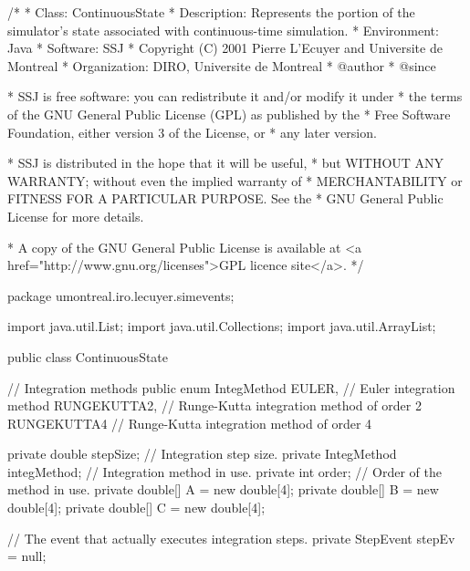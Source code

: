 \begin{code}
\begin{hide}
/*
 * Class:        ContinuousState
 * Description:  Represents the portion of the simulator's state associated
                 with continuous-time simulation.
 * Environment:  Java
 * Software:     SSJ 
 * Copyright (C) 2001  Pierre L'Ecuyer and Universite de Montreal
 * Organization: DIRO, Universite de Montreal
 * @author       
 * @since

 * SSJ is free software: you can redistribute it and/or modify it under
 * the terms of the GNU General Public License (GPL) as published by the
 * Free Software Foundation, either version 3 of the License, or
 * any later version.

 * SSJ is distributed in the hope that it will be useful,
 * but WITHOUT ANY WARRANTY; without even the implied warranty of
 * MERCHANTABILITY or FITNESS FOR A PARTICULAR PURPOSE.  See the
 * GNU General Public License for more details.

 * A copy of the GNU General Public License is available at
   <a href="http://www.gnu.org/licenses">GPL licence site</a>.
 */
\end{hide}
package umontreal.iro.lecuyer.simevents;\begin{hide}

import java.util.List;
import java.util.Collections;
import java.util.ArrayList;\end{hide}


public class ContinuousState \begin{hide} {
\end{hide}

   // Integration methods
   public enum IntegMethod{ 
      EULER,            // Euler integration method
      RUNGEKUTTA2,      // Runge-Kutta integration method of order 2
      RUNGEKUTTA4       // Runge-Kutta integration method of order 4
   }\begin{hide}

   private double stepSize;            // Integration step size.
   private IntegMethod integMethod;    // Integration method in use.
   private int order;                  // Order of the method in use.
   private double[] A = new double[4];
   private double[] B = new double[4];
   private double[] C = new double[4];

   // The event that actually executes integration steps.
   private StepEvent stepEv = null;


\end{hide}
\end{code}
